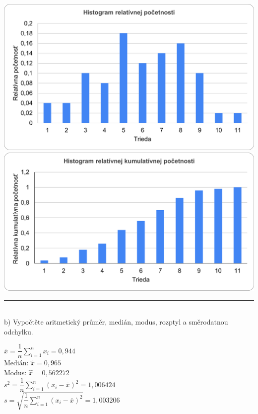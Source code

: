 \documentclass[pdftex, 11pt, a4paper, titlepage]{article}
\begin{document}
    \begin{center}
        \noindent
        \includegraphics[scale=0.8]{histogram_relat_pocetnost.png}\\\vspace{5pt}
        \includegraphics[scale=0.8]{histogram_relat_kumul_pocetnost.png}
    \end{center}

    \noindent\rule{\linewidth}{0.4pt}\\

    \noindent
    b) Vypočtěte aritmetický průměr, medián, modus, rozptyl a směrodatnou
    odchylku.

    \noindent
    $ \overline{x} = \dfrac{1}{n} \sum\limits_{i=1}^{n} x_i = 0,944 $ \\
    Medián: $ \tilde{x} = 0,965 $ \\
    Modus: $ \hat{x} = 0,562272 $ \\
    $ s^2 = \dfrac{1}{n} \sum\limits_{i=1}^{n} (x_i - \overline{x})^2 = 1,006424 $ \\
    $ s = \sqrt{\dfrac{1}{n} \sum\limits_{i=1}^{n} (x_i - \overline{x})^2} = 1,003206 $ \\
\end{document}
